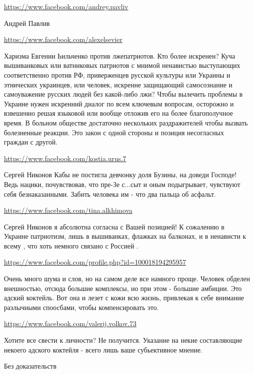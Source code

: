 \documentclass[a4paper,11pt]{extreport}
\begin{document}
\begin{itemize}
\url{https://www.facebook.com/andrey.pavliv}

Андрей Павлив

\url{https://www.facebook.com/alexelsevier}

Харизма Евгении Ьильченко против лжепатриотов. Кто более искренен? Куча вышиванковых или ватниковых патриотов с мнимой ненавистью выступающих соответственно против РФ, приверженцев русской культуры или Украины и этнических украинцев, или человек, искренне защищающий самосознание и самоуважение русских людей без какой-либо лжи? Чтобы вылечить проблемы в Украине нужен искренний диалог по всем ключевым вопросам, осторожно и взвешенно решая языковой или вообще отложив его на более благополучное время. В больном обществе достаточно нескольких раздражителей чтобы вызвать болезненные реакции. Это закон с одной стороны и позиция несогласных граждан с другой.

\begin{itemize}
\url{https://www.facebook.com/kostia.urus.7}

Сергей Никонов
Кабы не постигла девчонку доля Бузины, на доведи Господе! Ведь нацики, почувствовав, что пре-Зе с...сыт и оным подыгрывает, чувствуют себя безнаказанными. Забить человека им - что два пальца об асфальт.

\url{https://www.facebook.com/tina.alkhimova}

Сергей Никонов я абсолютна согласна с Вашей позицией! К сожалению в Украине патриотизм, лишь в вышиванках, флажках на балконах, и в ненависти к всему , что хоть немного связано с Россией .

\end{itemize}
\url{https://www.facebook.com/profile.php?id=100018194295957}

Очень много шума и слов, но на самом деле все намного проще. Человек обделен внешностью, отсюда большие комплексы, но при этом - большие амбиции. Это адский коктейль. Вот она и лезет с кожи всю жизнь, привлекая к себе внимание разлычными споосбами, чтобы компенсировать это.

\begin{itemize}
\url{https://www.facebook.com/valerij.volkov.73}

Хотите все свести к личности? Не получится.
Указание на некие составляющие некоего адского коктейля - всего лишь ваше субьективное мнение.

Без доказательств


\end{itemize}
\end{itemize}
\end{document}
